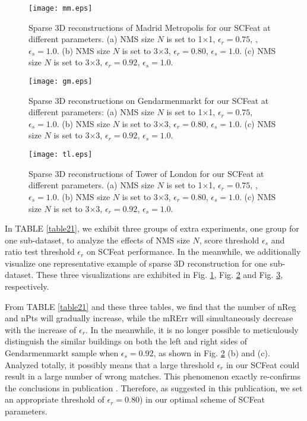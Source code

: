 \documentclass[journal]{IEEEtran}
\begin{document}
\begin{figure}[!t]
\centering
\texttt{[image: mm.eps]}
\caption{Sparse 3D reconstructions of Madrid Metropolis for our SCFeat at different parameters. (a) NMS size $N$ is set to 1$\times$1, $\epsilon_{r}=0.75$, , $\epsilon_{s}=1.0$. (b) NMS size $N$ is set to 3$\times$3, $\epsilon_{r}=0.80$, $\epsilon_{s}=1.0$. (c) NMS size $N$ is set to 3$\times$3, $\epsilon_{r}=0.92$, $\epsilon_{s}=1.0$.}
\label{fig31}
\end{figure}

\begin{figure}[!t]
\centering
\texttt{[image: gm.eps]}
\caption{Sparse 3D reconstructions on Gendarmenmarkt for our SCFeat at different parameters: (a) NMS size $N$ is set to 1$\times$1, $\epsilon_{r}=0.75$, $\epsilon_{s}=1.0$. (b) NMS size $N$ is set to 3$\times$3, $\epsilon_{r}=0.80$, $\epsilon_{s}=1.0$. (c) NMS size $N$ is set to 3$\times$3, $\epsilon_{r}=0.92$, $\epsilon_{s}=1.0$.}
\label{fig32}
\end{figure}

\begin{figure}[!t]
\centering
\texttt{[image: tl.eps]}
\caption{Sparse 3D reconstructions of Tower of London for our SCFeat at different parameters. (a) NMS size $N$ is set to 1$\times$1, $\epsilon_{r}=0.75$, , $\epsilon_{s}=1.0$. (b) NMS size $N$ is set to 3$\times$3, $\epsilon_{r}=0.80$, $\epsilon_{s}=1.0$. (c) NMS size $N$ is set to 3$\times$3, $\epsilon_{r}=0.92$, $\epsilon_{s}=1.0$.}
\label{fig33}
\end{figure}

In TABLE \ref{table21}, we exhibit three groups of extra experiments, one group for one sub-dataset, to analyze the effects of NMS size $N$, score threshold $\epsilon_s$ and ratio test threshold $\epsilon_{r}$ on SCFeat performance. 
In the meanwhile, we additionally visualize one representative example of sparse 3D reconstruction for one sub-dataset. These three visualizations are exhibited in Fig. \ref{fig31}, Fig. \ref{fig32} and Fig. \ref{fig33}, respectively. 

From TABLE \ref{table21} and these three tables, we find that the number of nReg and nPts will gradually increase, while the mRErr will simultaneously decrease with the increase of $\epsilon_{r}$. In the meanwhile, it is no longer possible to meticulously distinguish the similar buildings on both the left and right sides of Gendarmenmarkt sample when $\epsilon_s=0.92$, as shown in Fig. \ref{fig32} (b) and (c).
Analyzed totally, it possibly means that a large threshold $\epsilon_{r}$ in our SCFeat could result in a large number of wrong matches. This phenomenon exactly re-confirms the conclusions in publication \cite{hcrt:21}. Therefore, as suggested in this publication, we set an appropriate threshold of $\epsilon_{r}=0.80$) in our optimal scheme of SCFeat parameters.
\end{document}
